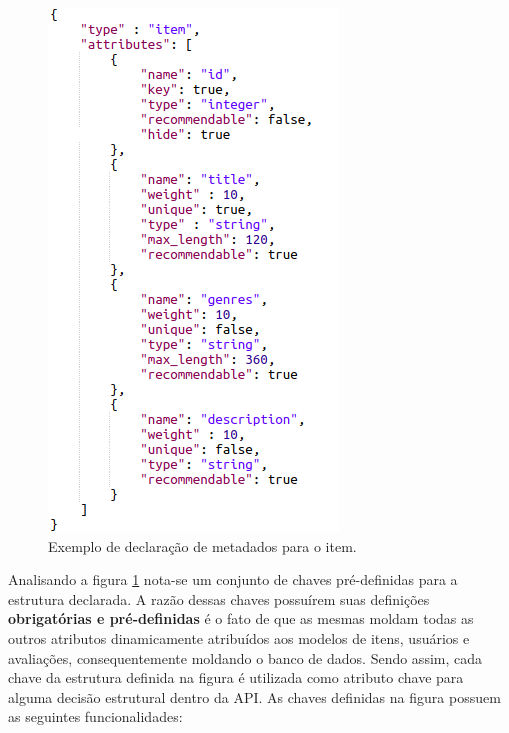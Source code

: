 \documentclass[12pt, openright, oneside, a4paper, brazil]{abntex2}
\begin{document}
\begin{figure}[htp]

	\caption{\label{metadata}Exemplo de declaração de metadados para o item.}

	\begin{center}
		\includegraphics[scale=0.8]{images/metadata.png}
	\end{center}

	\hspace{5.5cm}{Fonte: O Autor.}

\end{figure}

Analisando a figura \ref{metadata} nota-se um conjunto de chaves pré-definidas para a estrutura declarada. A razão dessas chaves possuírem suas definições \textbf{obrigatórias e pré-definidas} é o fato de que as mesmas moldam todas as outros atributos dinamicamente atribuídos aos modelos de itens, usuários e avaliações, consequentemente moldando o banco de dados. Sendo assim, cada chave da estrutura definida na figura é utilizada como atributo chave para alguma decisão estrutural dentro da API. As chaves definidas na figura possuem as seguintes funcionalidades:
\end{document}
